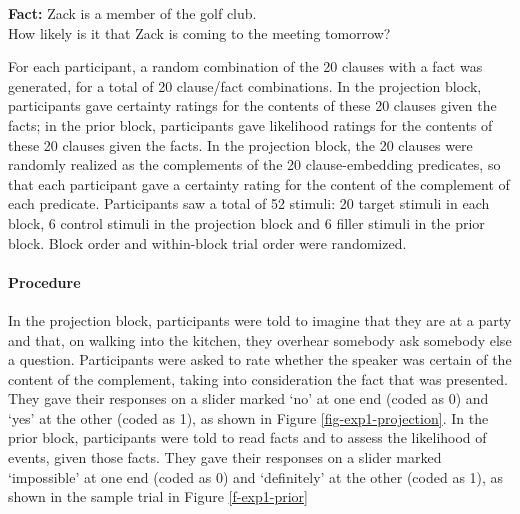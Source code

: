\documentclass[11pt,fleqn]{article}
\newcommand{\6}{\mbox{$[\hspace*{-.6mm}[$}}
\newcommand{\9}{\mbox{$]\hspace*{-.6mm}]$}}
\begin{document}
\begin{exe}
\ex\label{control-prior} {\bf Fact:}  Zack is a member of the golf club. \\ How likely is it that Zack is coming to the meeting tomorrow?
\end{exe}

For each participant, a random combination of the 20 clauses with a fact was generated, for a total of 20 clause/fact combinations. In the projection block, participants gave certainty ratings for the contents of these 20 clauses given the facts; in the prior block, participants gave likelihood ratings for the contents of these 20 clauses given the facts. In the projection block, the 20 clauses were randomly realized as the complements of the 20 clause-embedding predicates, so that each participant gave a certainty rating for the content of the complement of each predicate. Participants saw a total of 52 stimuli: 20 target stimuli in each block, 6 control stimuli in the projection block and 6 filler stimuli in the prior block. Block order and within-block trial order were randomized.

\paragraph{Procedure} In the projection block, participants were told to imagine that they are at a party and that, on walking into the kitchen, they overhear somebody ask somebody else a question. Participants were asked to rate whether the speaker was certain of the content of the complement, taking into consideration the fact that was presented. They gave their responses on a slider marked `no' at one end (coded as 0) and `yes' at the other (coded as 1), as shown in Figure \ref{fig-exp1-projection}. In the prior block, participants were told to read facts and to assess the likelihood of events, given those facts. They gave their responses on a slider marked `impossible' at one end (coded as 0) and `definitely' at the other (coded as 1), as shown in the sample trial in Figure \ref{f-exp1-prior}
\end{document}
